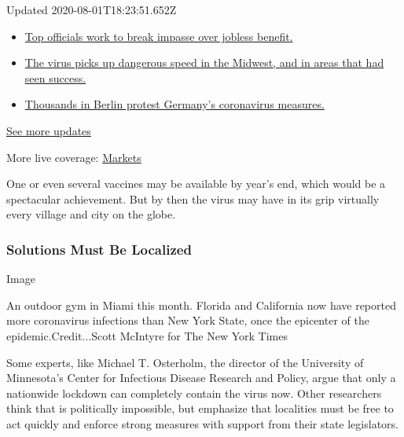 Updated 2020-08-01T18:23:51.652Z

\begin{itemize}
\tightlist
\item
  \href{https://www.nytimes.com/2020/08/01/world/coronavirus-covid-19.html?action=click\&pgtype=Article\&state=default\&region=MAIN_CONTENT_1\&context=storylines_live_updates\#link-3ac56579}{Top
  officials work to break impasse over jobless benefit.}
\item
  \href{https://www.nytimes.com/2020/08/01/world/coronavirus-covid-19.html?action=click\&pgtype=Article\&state=default\&region=MAIN_CONTENT_1\&context=storylines_live_updates\#link-8796723}{The
  virus picks up dangerous speed in the Midwest, and in areas that had
  seen success.}
\item
  \href{https://www.nytimes.com/2020/08/01/world/coronavirus-covid-19.html?action=click\&pgtype=Article\&state=default\&region=MAIN_CONTENT_1\&context=storylines_live_updates\#link-25930521}{Thousands
  in Berlin protest Germany's coronavirus measures.}
\end{itemize}

\href{https://www.nytimes.com/2020/08/01/world/coronavirus-covid-19.html?action=click\&pgtype=Article\&state=default\&region=MAIN_CONTENT_1\&context=storylines_live_updates}{See
more updates}

More live coverage:
\href{https://www.nytimes.com/live/2020/07/31/business/stock-market-today-coronavirus?action=click\&pgtype=Article\&state=default\&region=MAIN_CONTENT_1\&context=storylines_live_updates}{Markets}

One or even several vaccines may be available by year's end, which would
be a spectacular achievement. But by then the virus may have in its grip
virtually every village and city on the globe.

\hypertarget{solutions-must-be-localized}{%
\subsubsection{Solutions Must Be
Localized}\label{solutions-must-be-localized}}

Image

An outdoor gym in Miami this month. Florida and California now have
reported more coronavirus infections than New York State, once the
epicenter of the epidemic.Credit...Scott McIntyre for The New York Times

Some experts, like Michael T. Osterholm, the director of the University
of Minnesota's Center for Infectious Disease Research and Policy, argue
that only a nationwide lockdown can completely contain the virus now.
Other researchers think that is politically impossible, but emphasize
that localities must be free to act quickly and enforce strong measures
with support from their state legislators.

